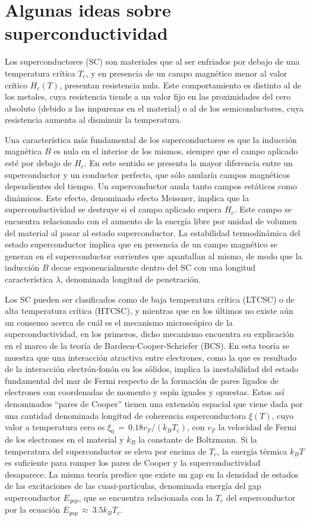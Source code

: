 \section{Algunas ideas sobre superconductividad}\label{S:super}
Los superconductores (SC) son materiales que al ser enfriados por debajo de una temperatura crítica $T_{c}$, y en presencia de un campo magnético menor al valor crítico $H_c(T)$, presentan resistencia nula. Este comportamiento es distinto al de los metales, cuya resistencia tiende a un valor fijo en las proximidades del cero absoluto (debido a las impurezas en el material) o al de los semiconductores, cuya resistencia aumenta al disminuir la temperatura.

Una característica más fundamental de los superconductores es que la inducción magnética $B$ es nula en el interior de los mismos, siempre que el campo aplicado esté por debajo de $H_c$. En este sentido se presenta la mayor diferencia entre un superconductor y un conductor perfecto, que sólo anularía campos magnéticos dependientes del tiempo. Un superconductor anula tanto campos estáticos como dinámicos. Este efecto, denominado efecto Meissner, implica que la superconductividad se destruye si el campo aplicado supera $H_c$. Este campo se encuentra relacionado con el aumento de la energía libre por unidad de volumen del material al pasar al estado superconductor. La estabilidad termodinámica del estado superconductor implica que en presencia de un campo magnético se generan en el superconductor corrientes que apantallan al mismo, de modo que la inducción $B$ decae exponencialmente dentro del SC con una longitud característica $\lambda$, denominada longitud de penetración.

Los SC pueden ser clasificados como de baja temperatura crítica (LTCSC) o de alta temperatura crítica (HTCSC), y mientras que en los últimos no existe aún un consenso acerca de cuál es el mecanismo microscópico de la superconductividad, en los primeros, dicho mecanismo encuentra su explicación en el marco de la teoría de Bardeen-Cooper-Schriefer (BCS)\cite{Bardeen1957}. En esta teoría se muestra que una interacción atractiva entre electrones, como la que es resultado de la interacción electrón-fonón en los sólidos, implica la inestabilidad del estado fundamental del mar de Fermi respecto de la formación de pares ligados de electrones con coordenadas de momento y espín iguales y opuestas. Estos así denominados ``pares de Cooper'' tienen una extensión espacial que viene dada por una cantidad denominada longitud de coherencia superconductora $\xi(T)$, cuyo valor a temperatura cero es $\xi_0 \, = \, 0.18v_F/(k_BT_c)$, con $v_F$ la velocidad de Fermi de los electrones en el material y $k_B$ la constante de Boltzmann. Si la temperatura del superconductor se eleva por encima de $T_c$, la energía térmica $k_B T$ es suficiente para romper los pares de Cooper y la superconductividad desaparece. La misma teoría predice que existe un gap en la densidad de estados de las excitaciones de las cuasi-partículas, denominada energía del gap superconductor $E_{gap}$, que se encuentra relacionada con la $T_c$ del superconductor por la ecuación $E_{gap} \, \approx \ 3.5k_B T_c$\citep{Irwin2005}. 

